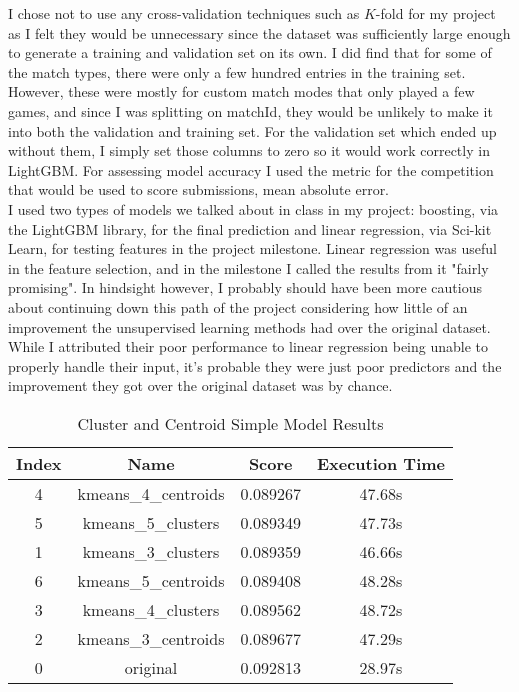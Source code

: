 \documentclass[11pt]{article}
\begin{document}
I chose not to use any cross-validation techniques such as $K$-fold for my project as I felt they would be
unnecessary since the dataset was sufficiently large enough to generate a training and validation set on its
own. I did find that for some of the match types, there were only a few hundred entries in the training set.
However, these were mostly for custom match modes that only played a few games, and since I was splitting on
matchId, they would be unlikely to make it into both the validation and training set. For the validation set
which ended up without them, I simply set those columns to zero so it would work correctly in LightGBM.
For assessing model accuracy I used the metric for the competition that would be used to score submissions, 
mean absolute error.\\

I used two types of models we talked about in class in my project: boosting, via the LightGBM library, for
the final prediction and linear regression, via Sci-kit Learn, for testing features in the project
milestone.\cite{ke2017lightgbm}\cite{scikit-learn} Linear regression was useful in the feature selection,
and in the milestone I called the results from it "fairly promising". In hindsight however, I probably should
have been more cautious about continuing down this path of the project considering how little of an improvement
the unsupervised learning methods had over the original dataset. While I attributed their poor performance to 
linear regression being unable to properly handle their input, it's probable they were just poor predictors
and the improvement they got over the original dataset was by chance.

\begin{table}[h]
 \centering
 \caption{Cluster and Centroid Simple Model Results}
 \begin{tabular}{||c c c c||} 
 \hline
 Index & Name & Score & Execution Time \\ [0.5ex] 
 \hline\hline
 4 & kmeans\_4\_centroids & 0.089267 &	47.68s \\ 
 \hline
 5 & kmeans\_5\_clusters & 0.089349 & 47.73s \\
 \hline
 1 & kmeans\_3\_clusters & 0.089359 &	46.66s \\
 \hline
 6 & kmeans\_5\_centroids & 0.089408 &	48.28s \\
 \hline
 3 & kmeans\_4\_clusters & 0.089562 & 48.72s \\
 \hline
 2 & kmeans\_3\_centroids & 0.089677 & 47.29s \\
 \hline
 0 & original &	0.092813 & 28.97s \\ 
 \hline
\end{tabular}
\end{table}
\end{document}
